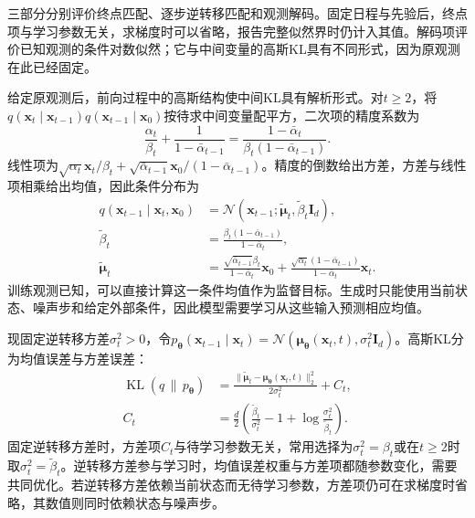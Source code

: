 三部分分别评价终点匹配、逐步逆转移匹配和观测解码。固定日程与先验后，终点项与学习参数无关，求梯度时可以省略，报告完整似然界时仍计入其值。解码项评价已知观测的条件对数似然；它与中间变量的高斯KL具有不同形式，因为原观测在此已经固定。

给定原观测后，前向过程中的高斯结构使中间KL具有解析形式。对$t\geq2$，将$q(\bm{x}_t\mid\bm{x}_{t-1})q(\bm{x}_{t-1}\mid\bm{x}_0)$按待求中间变量配平方，二次项的精度系数为
\[
  \frac{\alpha_t}{\beta_t}
    +\frac{1}{1-\bar{\alpha}_{t-1}}
  =\frac{1-\bar{\alpha}_t}
          {\beta_t(1-\bar{\alpha}_{t-1})}.
\]
线性项为$\sqrt{\alpha_t}\bm{x}_t/\beta_t+\sqrt{\bar{\alpha}_{t-1}}\bm{x}_0/(1-\bar{\alpha}_{t-1})$。精度的倒数给出方差，方差与线性项相乘给出均值，因此条件分布为
\begin{equation}
  \label{eq:pgm-generative-forward-posterior}
  \begin{aligned}
    q(\bm{x}_{t-1}\mid\bm{x}_t,\bm{x}_0)
      &=\mathcal{N}(\bm{x}_{t-1};
          \widetilde{\bm{\mu}}_t,\widetilde{\beta}_t\bm{I}_d),\\
    \widetilde{\beta}_t
      &=\frac{\beta_t(1-\bar{\alpha}_{t-1})}
              {1-\bar{\alpha}_t},\\
    \widetilde{\bm{\mu}}_t
      &=\frac{\sqrt{\bar{\alpha}_{t-1}}\beta_t}
               {1-\bar{\alpha}_t}\bm{x}_0
       +\frac{\sqrt{\alpha_t}(1-\bar{\alpha}_{t-1})}
               {1-\bar{\alpha}_t}\bm{x}_t.
  \end{aligned}
\end{equation}
训练观测已知，可以直接计算这一条件均值作为监督目标。生成时只能使用当前状态、噪声步和给定外部条件，因此模型需要学习从这些输入预测相应均值。

现固定逆转移方差$\sigma_t^2>0$，令$p_{\bm{\theta}}(\bm{x}_{t-1}\mid\bm{x}_t)=\mathcal{N}(\bm{\mu}_{\bm{\theta}}(\bm{x}_t,t),\sigma_t^2\bm{I}_d)$。高斯KL分为均值误差与方差误差：
\begin{equation}
  \label{eq:pgm-generative-gaussian-step-kl}
  \begin{aligned}
    \operatorname{KL}(q\,\|\,p_{\bm{\theta}})
      &=\frac{\lVert\widetilde{\bm{\mu}}_t
                    -\bm{\mu}_{\bm{\theta}}(\bm{x}_t,t)\rVert_2^2}
               {2\sigma_t^2}+C_t,\\
    C_t&=\frac{d}{2}
       \left(\frac{\widetilde{\beta}_t}{\sigma_t^2}
              -1+\log\frac{\sigma_t^2}{\widetilde{\beta}_t}\right).
  \end{aligned}
\end{equation}
固定逆转移方差时，方差项$C_t$与待学习参数无关，常用选择为$\sigma_t^2=\beta_t$或在$t\geq2$时取$\sigma_t^2=\widetilde{\beta}_t$。逆转移方差参与学习时，均值误差权重与方差项都随参数变化，需要共同优化。若逆转移方差依赖当前状态而无待学习参数，方差项仍可在求梯度时省略，其数值则同时依赖状态与噪声步。

